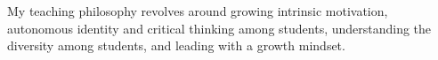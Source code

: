 \documentclass[10pt]{article}
\renewcommand*\paragraph[1]{}
\begin{document}
\paragraph{Teaching Philosophy}
My teaching philosophy revolves around growing intrinsic motivation, autonomous identity and critical thinking among students, understanding the diversity among students, and leading with a growth mindset.
\paragraph{4) Good communication skills.}

\paragraph{4) Teaching Experience of lot of credits.}
\end{document}
